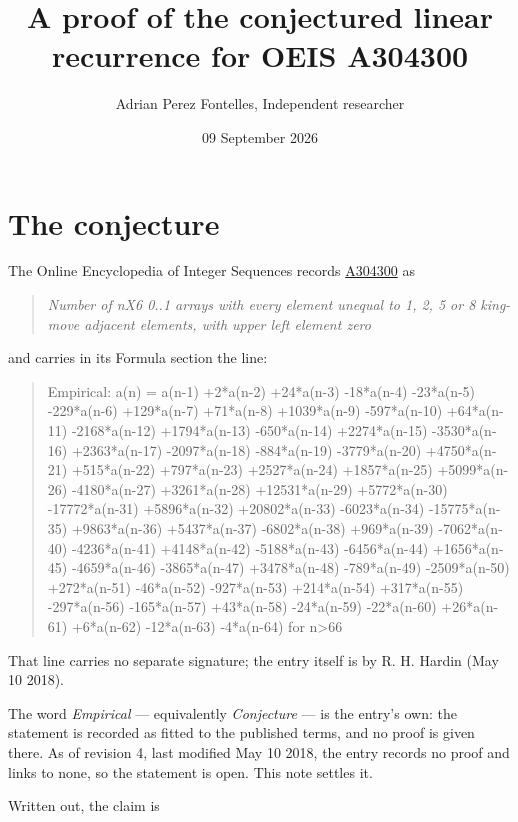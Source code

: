 \documentclass[11pt]{article}
\title{A proof of the conjectured linear recurrence for OEIS A304300}
\author{Adrian Perez Fontelles, Independent researcher}
\date{09 September 2026}
\theoremstyle{definition}
\begin{document}
\maketitle
\section{The conjecture}

The Online Encyclopedia of Integer Sequences records \href{https://oeis.org/A304300}{A304300} as

\begin{quote}\itshape Number of nX6 0..1 arrays with every element unequal to 1, 2, 5 or 8 king-move adjacent elements, with upper left element zero\end{quote}

and carries in its Formula section the line:

\begin{quote}\ttfamily Empirical: a(n) = a(n-1) +2*a(n-2) +24*a(n-3) -18*a(n-4) -23*a(n-5) -229*a(n-6) +129*a(n-7) +71*a(n-8) +1039*a(n-9) -597*a(n-10) +64*a(n-11) -2168*a(n-12) +1794*a(n-13) -650*a(n-14) +2274*a(n-15) -3530*a(n-16) +2363*a(n-17) -2097*a(n-18) -884*a(n-19) -3779*a(n-20) +4750*a(n-21) +515*a(n-22) +797*a(n-23) +2527*a(n-24) +1857*a(n-25) +5099*a(n-26) -4180*a(n-27) +3261*a(n-28) +12531*a(n-29) +5772*a(n-30) -17772*a(n-31) +5896*a(n-32) +20802*a(n-33) -6023*a(n-34) -15775*a(n-35) +9863*a(n-36) +5437*a(n-37) -6802*a(n-38) +969*a(n-39) -7062*a(n-40) -4236*a(n-41) +4148*a(n-42) -5188*a(n-43) -6456*a(n-44) +1656*a(n-45) -4659*a(n-46) -3865*a(n-47) +3478*a(n-48) -789*a(n-49) -2509*a(n-50) +272*a(n-51) -46*a(n-52) -927*a(n-53) +214*a(n-54) +317*a(n-55) -297*a(n-56) -165*a(n-57) +43*a(n-58) -24*a(n-59) -22*a(n-60) +26*a(n-61) +6*a(n-62) -12*a(n-63) -4*a(n-64) for n>66\end{quote}

That line carries no separate signature; the entry itself is by R. H. Hardin (May 10 2018).

The word {\itshape Empirical} --- equivalently {\itshape Conjecture} --- is the entry's own: the statement is recorded as fitted to the published terms, and no proof is given there. As of revision 4, last modified May 10 2018, the entry records no proof and links to none, so the statement is open. This note settles it.

Written out, the claim is
\end{document}
